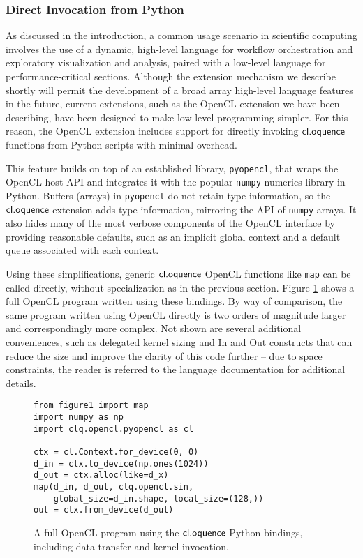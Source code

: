 \documentclass[10pt, conference, compsocconf]{IEEEtran}
\begin{document}
\subsubsection{Direct Invocation from Python}\label{direct}
As discussed in the introduction, a common usage scenario in scientific computing involves the use of a dynamic, high-level language for workflow orchestration and exploratory visualization and analysis, paired with a low-level language for performance-critical sections. Although the extension mechanism we describe shortly will permit the development of a broad array high-level language features in the future, current extensions, such as the OpenCL extension we have been describing, have been designed to make low-level programming simpler. For this reason, the OpenCL extension includes support for directly invoking $\textsf{cl.oquence}$ functions from Python scripts with minimal overhead.

This feature builds on top of an established library, \verb|pyopencl|, that wraps the OpenCL host API and integrates it with the popular \verb|numpy| numerics library in Python. Buffers (arrays) in \verb|pyopencl| do not retain type information, so the $\textsf{cl.oquence}$ extension adds type information, mirroring the API of \verb|numpy| arrays. It also hides many of the most verbose components of the OpenCL interface by providing reasonable defaults, such as an implicit global context and a default queue associated with each context. 

Using these simplifications, generic $\textsf{cl.oquence}$ OpenCL functions like \verb|map| can be called directly, without specialization as in the previous section. Figure \ref{py} shows a full OpenCL program written using these bindings. By way of comparison, the same program written using OpenCL directly is two orders of magnitude larger and correspondingly more complex. Not shown are several additional conveniences, such as delegated kernel sizing and In and Out constructs that can reduce the size and improve the clarity of this code further -- due to space constraints, the reader is referred to the language documentation for additional details.

\begin{figure}
\small{\begin{verbatim}
from figure1 import map
import numpy as np
import clq.opencl.pyopencl as cl

ctx = cl.Context.for_device(0, 0)
d_in = ctx.to_device(np.ones(1024))
d_out = ctx.alloc(like=d_x)
map(d_in, d_out, clq.opencl.sin, 
    global_size=d_in.shape, local_size=(128,))
out = ctx.from_device(d_out)
\end{verbatim}}
\caption{A full OpenCL program using the $\textsf{cl.oquence}$ Python bindings, including data transfer and kernel invocation.}
\label{py}
\end{figure}
\end{document}
